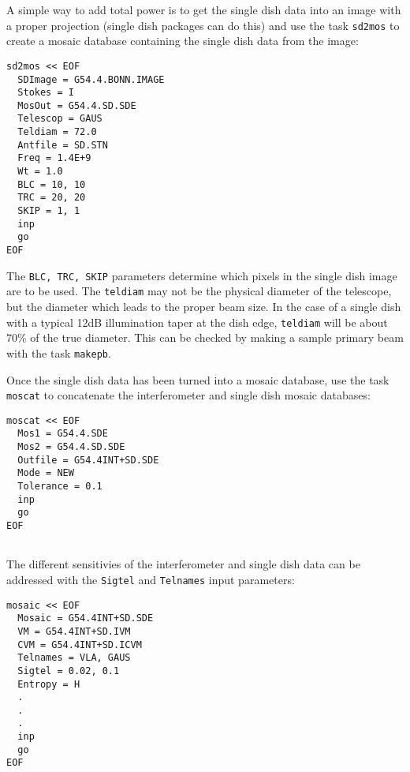 A simple way to add total power is to get the single dish data into an
image with a proper projection (single dish packages can do this) and
use the task {\tt sd2mos} to create a mosaic database containing the
single dish data from the image:
\begin{verbatim}
sd2mos << EOF
  SDImage = G54.4.BONN.IMAGE
  Stokes = I
  MosOut = G54.4.SD.SDE
  Telescop = GAUS
  Teldiam = 72.0
  Antfile = SD.STN
  Freq = 1.4E+9
  Wt = 1.0
  BLC = 10, 10
  TRC = 20, 20
  SKIP = 1, 1
  inp  
  go
EOF
\end{verbatim}
The {\tt BLC, TRC, SKIP} parameters determine which pixels in the
single dish image are to be used.  The {\tt teldiam} may not be the
physical diameter of the telescope, but the diameter which leads to
the proper beam size.  In the case of a single dish with a typical
12dB illumination taper at the dish edge, {\tt teldiam} will be about 70\%
of the true diameter.  This can be checked by making a sample primary
beam with the task {\tt makepb}.

Once the single dish data has been turned into a mosaic database, use
the task {\tt moscat} to concatenate the interferometer and single dish
mosaic databases:
\begin{verbatim}
moscat << EOF
  Mos1 = G54.4.SDE
  Mos2 = G54.4.SD.SDE
  Outfile = G54.4INT+SD.SDE
  Mode = NEW
  Tolerance = 0.1
  inp
  go
EOF
  
\end{verbatim}
The different sensitivies of the interferometer and single dish data
can be addressed with the {\tt Sigtel} and {\tt Telnames} input
parameters:
\begin{verbatim}
mosaic << EOF
  Mosaic = G54.4INT+SD.SDE
  VM = G54.4INT+SD.IVM
  CVM = G54.4INT+SD.ICVM
  Telnames = VLA, GAUS
  Sigtel = 0.02, 0.1
  Entropy = H
  .
  .
  .
  inp
  go
EOF
\end{verbatim}

